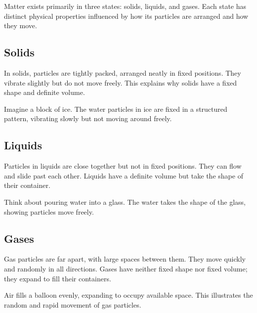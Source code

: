 Matter exists primarily in three states: solids, liquids, and gases. Each state has distinct physical properties influenced by how its particles are arranged and how they move.

\subsection{Solids}

In solids, particles are tightly packed, arranged neatly in fixed positions. They vibrate slightly but do not move freely. This explains why solids have a fixed shape and definite volume.


\begin{example}
Imagine a block of ice. The water particles in ice are fixed in a structured pattern, vibrating slowly but not moving around freely.
\end{example}

\subsection{Liquids}

Particles in liquids are close together but not in fixed positions. They can flow and slide past each other. Liquids have a definite volume but take the shape of their container.


\begin{example}
Think about pouring water into a glass. The water takes the shape of the glass, showing particles move freely.
\end{example}

\subsection{Gases}

Gas particles are far apart, with large spaces between them. They move quickly and randomly in all directions. Gases have neither fixed shape nor fixed volume; they expand to fill their containers.


\begin{example}
Air fills a balloon evenly, expanding to occupy available space. This illustrates the random and rapid movement of gas particles.
\end{example}

